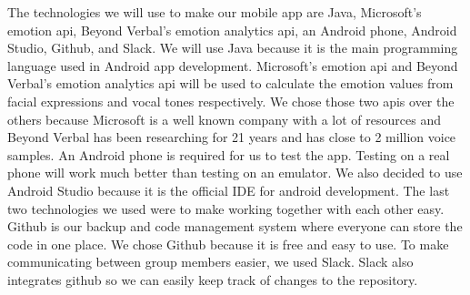 The technologies we will use to make our mobile app are Java, Microsoft’s emotion api, Beyond Verbal’s emotion analytics api, an Android phone, Android Studio, Github, and Slack. We will use Java because it is the main programming language used in Android app development. Microsoft’s emotion api and Beyond Verbal’s emotion analytics api will be used to calculate the emotion values from facial expressions and vocal tones respectively. We chose those two apis over the others because Microsoft is a well known company with a lot of resources and Beyond Verbal has been researching for 21 years and has close to 2 million voice samples. An Android phone is required for us to test the app. Testing on a real phone will work much better than testing on an emulator. We also decided to use Android Studio because it is the official IDE for android development. The last two technologies we used were to make working together with each other easy. Github is our backup and code management system where everyone can store the code in one place. We chose Github because it is free and easy to use. To make communicating between group members easier, we used Slack. Slack also integrates github so we can easily keep track of changes to the repository.